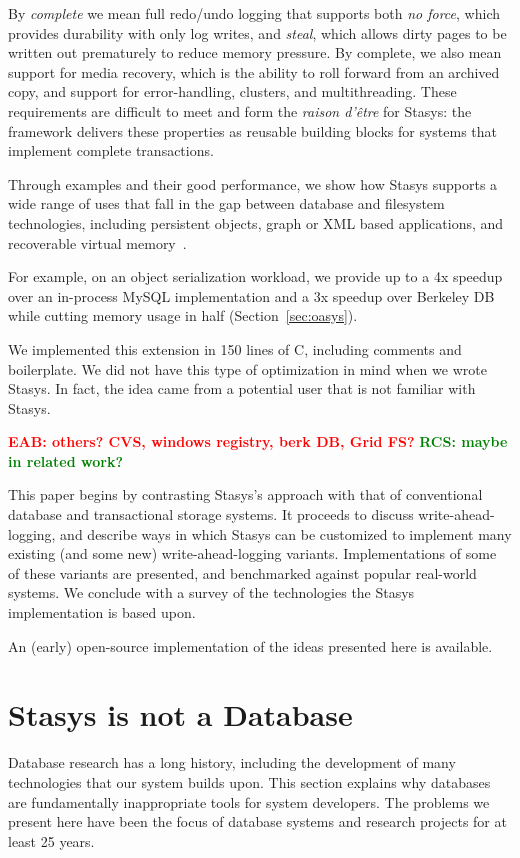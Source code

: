\documentclass[letterpaper,twocolumn,10pt]{article}
\newcommand{\yad}{Stasys\xspace}
\newcommand{\eab}[1]{\textcolor{red}{\bf EAB: #1}}
\newcommand{\rcs}[1]{\textcolor{green}{\bf RCS: #1}}
\begin{document}
By {\em complete} we mean full redo/undo logging that supports
both {\em no force}, which provides durability with only log writes,
and {\em steal}, which allows dirty pages to be written out prematurely
to reduce memory pressure. By complete, we also
mean support for media recovery, which is the ability to roll
forward from an archived copy, and support for error-handling,
clusters, and multithreading. These requirements are difficult
to meet and form the {\em raison d'\^etre} for \yad{}: the framework
delivers these properties as reusable building blocks for systems
that implement complete transactions.

Through examples and their good performance, we show how \yad{}
supports a wide range of uses that fall in the gap between 
database and filesystem technologies, including
persistent objects, graph or XML based applications, and recoverable
virtual memory~\cite{lrvm}.  

For example, on an object serialization workload, we provide up to 
a 4x speedup over an in-process 
MySQL implementation and a 3x speedup over Berkeley DB while 
cutting memory usage in half (Section~\ref{sec:oasys}). 

We implemented this extension in 150 lines of C, including comments and boilerplate.  We did not have this type of optimization
in mind when we wrote \yad.  In fact, the idea came from a potential 
user that is not familiar with \yad.

\eab{others?  CVS, windows registry, berk DB, Grid FS?}
\rcs{maybe in related work?}

This paper begins by contrasting \yad's approach with that of
conventional database and transactional storage systems.  It proceeds
to discuss write-ahead-logging, and describe ways in which \yad can be
customized to implement many existing (and some new) write-ahead-logging variants.  Implementations of some of these variants are
presented, and benchmarked against popular real-world systems.  We
conclude with a survey of the technologies the \yad implementation is
based upon.

An (early) open-source implementation of
the ideas presented here is available.

\section{\yad is not a Database}
\label{sec:notDB}
Database research has a long history, including the development of
many technologies that our system builds upon.  This section explains
why databases are fundamentally inappropriate tools for system
developers.  The problems we present here have been the focus of
database systems and research projects for at least 25 years.
\end{document}
